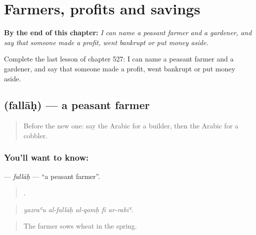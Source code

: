 
\chapter{Farmers, profits and savings}
\label{ch:ar-farmers-profits-and-savings}

\begin{chapteropening}
\textbf{By the end of this chapter:} \emph{I can name a peasant farmer and a gardener, and say that someone made a profit, went bankrupt or put money aside.}

Complete the last lesson of chapter 527: I can name a peasant farmer and a gardener, and say that someone made a profit, went bankrupt or put money aside.
\end{chapteropening}

\section[\texorpdfstring{\ar{فلاح} (fallāḥ)}{فلاح (fallāḥ)}]{ (fallāḥ) — a peasant farmer}

\label{lesson:AR-C527-fallah}



\begin{quote}
Before the new one: say the Arabic for a builder, then the Arabic for a cobbler.
\end{quote}

\subsection*{You'll want to know: }
\textbf{} — \emph{fallāḥ} — \textquotedblleft{}a peasant farmer\textquotedblright{}.

\begin{quote}
    .
\end{quote}

\begin{quote}
\emph{yazraʿu al-fallāḥ al-qamḥ fī ar-rabīʿ.}
\end{quote}

\begin{quote}
The farmer sows wheat in the spring.
\end{quote}

